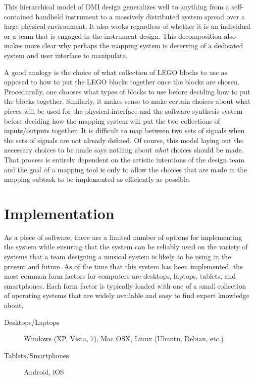 This hierarchical model of DMI design generalizes well to anything from a self-contained handheld instrument to a massively distributed system spread over a large physical environment. It also works regardless of whether it is an individual or a team that is engaged in the instrument design. This decomposition also makes more clear why perhaps the mapping system is deserving of a dedicated system and user interface to manipulate. 

A good analogy is the choice of what collection of LEGO blocks to use as opposed to how to put the LEGO blocks together once the blocks are chosen. Procedurally, one chooses what types of blocks to use before deciding how to put the blocks together. Similarly, it makes sense to make certain choices about what pieces will be used for the physical interface and the software synthesis system before deciding how the mapping system will put the two collections of inputs/outputs together. It is difficult to map between two sets of signals when the sets of signals are not already defined. Of course, this model laying out the necessary choices to be made says nothing about \emph{what} choices should be made. That process is entirely dependent on the artistic intentions of the design team and the goal of a mapping tool is only to allow the choices that are made in the mapping subtask to be implemented as efficiently as possible.

\section{Implementation}

As a piece of software, there are a limited number of options for implementing the system while ensuring that the system can be reliably used on the variety of systems that a team designing a musical system is likely to be using in the present and future. As of the time that this system has been implemented, the most common form factors for computers are desktops, laptops, tablets, and smartphones. Each form factor is typically loaded with one of a small collection of operating systems that are widely available and easy to find expert knowledge about.

\begin{description}
\item[Desktops/Laptops] Windows (XP, Vista, 7), Mac OSX, Linux (Ubuntu, Debian, etc.)
\item[Tablets/Smartphones] Android, iOS
\end{description}

